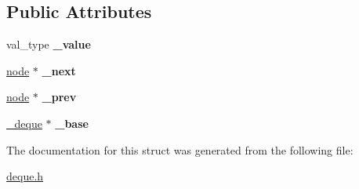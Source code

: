 \subsection*{Public Attributes}
\begin{DoxyCompactItemize}
\item 
\hypertarget{structnode_a10faac7d7a8c74b14071308f7f39247f}{}\label{structnode_a10faac7d7a8c74b14071308f7f39247f} 
val\+\_\+type {\bfseries \+\_\+value}
\item 
\hypertarget{structnode_a21b1a1c25784f032c41ca82c3105132f}{}\label{structnode_a21b1a1c25784f032c41ca82c3105132f} 
\hyperlink{structnode}{node} $\ast$ {\bfseries \+\_\+next}
\item 
\hypertarget{structnode_a8d2a82ad70ae3f132b401aa1ae738559}{}\label{structnode_a8d2a82ad70ae3f132b401aa1ae738559} 
\hyperlink{structnode}{node} $\ast$ {\bfseries \+\_\+prev}
\item 
\hypertarget{structnode_acdba0ce14272f634131e65d36b41aacc}{}\label{structnode_acdba0ce14272f634131e65d36b41aacc} 
\hyperlink{classdeque__base}{\+\_\+deque} $\ast$ {\bfseries \+\_\+base}
\end{DoxyCompactItemize}


The documentation for this struct was generated from the following file\+:\begin{DoxyCompactItemize}
\item 
\hyperlink{deque_8h}{deque.\+h}\end{DoxyCompactItemize}
